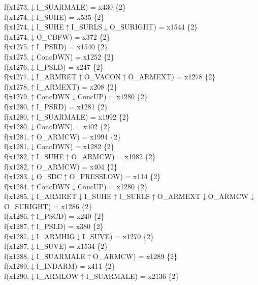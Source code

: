f(x1273,$\downarrow$I\_SUARMALE) = x430 \{2\} \\  
f(x1274,$\downarrow$I\_SUHE) = x535 \{2\} \\  
f(x1274,$\downarrow$I\_SUHE$\uparrow$I\_SURLS$\downarrow$O\_SURIGHT) = x1544 \{2\} \\  
f(x1274,$\downarrow$O\_CBFW) = x372 \{2\} \\  
f(x1275,$\uparrow$I\_PSRD) = x1540 \{2\} \\  
f(x1275,$\downarrow$ConcDWN) = x1252 \{2\} \\  
f(x1276,$\downarrow$I\_PSLD) = x247 \{2\} \\  
f(x1277,$\downarrow$I\_ARMRET$\uparrow$O\_VACON$\uparrow$O\_ARMEXT) = x1278 \{2\} \\  
f(x1278,$\uparrow$I\_ARMEXT) = x208 \{2\} \\  
f(x1279,$\uparrow$ConcDWN$\downarrow$ConcUP) = x1280 \{2\} \\  
f(x1280,$\uparrow$I\_PSRD) = x1281 \{2\} \\  
f(x1280,$\uparrow$I\_SUARMALE) = x1992 \{2\} \\  
f(x1280,$\downarrow$ConcDWN) = x402 \{2\} \\  
f(x1281,$\uparrow$O\_ARMCW) = x1994 \{2\} \\  
f(x1281,$\downarrow$ConcDWN) = x1282 \{2\} \\  
f(x1282,$\uparrow$I\_SUHE$\uparrow$O\_ARMCW) = x1982 \{2\} \\  
f(x1282,$\uparrow$O\_ARMCW) = x404 \{2\} \\  
f(x1283,$\downarrow$O\_SDC$\uparrow$O\_PRESSLOW) = x114 \{2\} \\  
f(x1284,$\uparrow$ConcDWN$\downarrow$ConcUP) = x1280 \{2\} \\  
f(x1285,$\downarrow$I\_ARMRET$\downarrow$I\_SUHE$\uparrow$I\_SURLS$\uparrow$O\_ARMEXT$\downarrow$O\_ARMCW$\downarrow$O\_SURIGHT) = x1286 \{2\} \\  
f(x1286,$\uparrow$I\_PSCD) = x240 \{2\} \\  
f(x1287,$\uparrow$I\_PSLD) = x380 \{2\} \\  
f(x1287,$\downarrow$I\_ARMHIG$\downarrow$I\_SUVE) = x1270 \{2\} \\  
f(x1287,$\downarrow$I\_SUVE) = x1534 \{2\} \\  
f(x1288,$\downarrow$I\_SUARMALE$\uparrow$O\_ARMCW) = x1289 \{2\} \\  
f(x1289,$\downarrow$I\_INDARM) = x411 \{2\} \\  
f(x1290,$\downarrow$I\_ARMLOW$\uparrow$I\_SUARMALE) = x2136 \{2\} \\  
